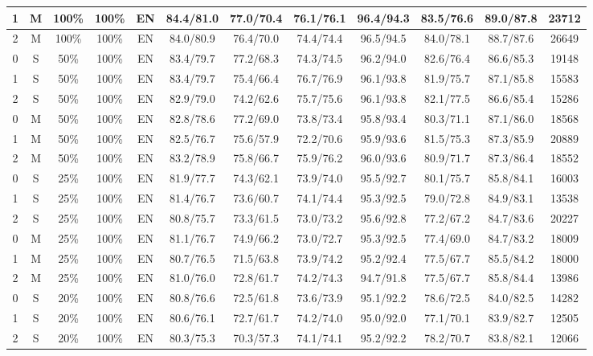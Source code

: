 \begin{table*}
{\begin{tabular}{|c|c|c|c|c||c|c|c|c|c|c||c|}
1 & M & 100\% & 100\% & EN & 84.4/81.0 & 77.0/70.4 & 76.1/76.1 & 96.4/94.3 & 83.5/76.6 & 89.0/87.8 & 23712 \\ \hline
2 & M & 100\% & 100\% & EN & 84.0/80.9 & 76.4/70.0 & 74.4/74.4 & 96.5/94.5 & 84.0/78.1 & 88.7/87.6 & 26649 \\ \hline
0 & S & 50\% & 100\% & EN & 83.4/79.7 & 77.2/68.3 & 74.3/74.5 & 96.2/94.0 & 82.6/76.4 & 86.6/85.3 & 19148 \\ \hline
1 & S & 50\% & 100\% & EN & 83.4/79.7 & 75.4/66.4 & 76.7/76.9 & 96.1/93.8 & 81.9/75.7 & 87.1/85.8 & 15583 \\ \hline
2 & S & 50\% & 100\% & EN & 82.9/79.0 & 74.2/62.6 & 75.7/75.6 & 96.1/93.8 & 82.1/77.5 & 86.6/85.4 & 15286 \\ \hline
0 & M & 50\% & 100\% & EN & 82.8/78.6 & 77.2/69.0 & 73.8/73.4 & 95.8/93.4 & 80.3/71.1 & 87.1/86.0 & 18568 \\ \hline
1 & M & 50\% & 100\% & EN & 82.5/76.7 & 75.6/57.9 & 72.2/70.6 & 95.9/93.6 & 81.5/75.3 & 87.3/85.9 & 20889 \\ \hline
2 & M & 50\% & 100\% & EN & 83.2/78.9 & 75.8/66.7 & 75.9/76.2 & 96.0/93.6 & 80.9/71.7 & 87.3/86.4 & 18552 \\ \hline
0 & S & 25\% & 100\% & EN & 81.9/77.7 & 74.3/62.1 & 73.9/74.0 & 95.5/92.7 & 80.1/75.7 & 85.8/84.1 & 16003 \\ \hline
1 & S & 25\% & 100\% & EN & 81.4/76.7 & 73.6/60.7 & 74.1/74.4 & 95.3/92.5 & 79.0/72.8 & 84.9/83.1 & 13538 \\ \hline
2 & S & 25\% & 100\% & EN & 80.8/75.7 & 73.3/61.5 & 73.0/73.2 & 95.6/92.8 & 77.2/67.2 & 84.7/83.6 & 20227 \\ \hline
0 & M & 25\% & 100\% & EN & 81.1/76.7 & 74.9/66.2 & 73.0/72.7 & 95.3/92.5 & 77.4/69.0 & 84.7/83.2 & 18009 \\ \hline
1 & M & 25\% & 100\% & EN & 80.7/76.5 & 71.5/63.8 & 73.9/74.2 & 95.2/92.4 & 77.5/67.7 & 85.5/84.2 & 18000 \\ \hline
2 & M & 25\% & 100\% & EN & 81.0/76.0 & 72.8/61.7 & 74.2/74.3 & 94.7/91.8 & 77.5/67.7 & 85.8/84.4 & 13986 \\ \hline
0 & S & 20\% & 100\% & EN & 80.8/76.6 & 72.5/61.8 & 73.6/73.9 & 95.1/92.2 & 78.6/72.5 & 84.0/82.5 & 14282 \\ \hline
1 & S & 20\% & 100\% & EN & 80.6/76.1 & 72.7/61.7 & 74.2/74.0 & 95.0/92.0 & 77.1/70.1 & 83.9/82.7 & 12505 \\ \hline
2 & S & 20\% & 100\% & EN & 80.3/75.3 & 70.3/57.3 & 74.1/74.1 & 95.2/92.2 & 78.2/70.7 & 83.8/82.1 & 12066 \\ \hline

\end{tabular}}
\end{table*}
